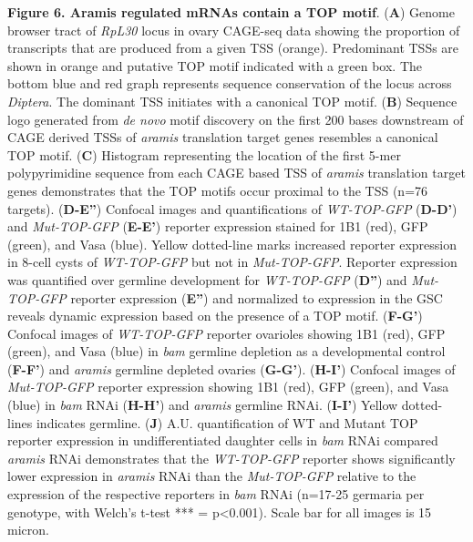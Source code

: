 \documentclass[12pt,twoside]{reedthesis}
\begin{document}
\textbf{Figure 6. Aramis regulated mRNAs contain a TOP motif}. (\textbf{A}) Genome
browser tract of \emph{RpL30} locus in ovary CAGE-seq data showing the
proportion of transcripts that are produced from a given TSS (orange).
Predominant TSSs are shown in orange and putative TOP motif indicated
with a green box. The bottom blue and red graph represents sequence
conservation of the locus across \emph{Diptera}. The dominant TSS initiates
with a canonical TOP motif. (\textbf{B}) Sequence logo generated from \emph{de
novo} motif discovery on the first 200 bases downstream of CAGE derived
TSSs of \emph{aramis} translation target genes resembles a canonical TOP
motif. (\textbf{C}) Histogram representing the location of the first 5-mer
polypyrimidine sequence from each CAGE based TSS of \emph{aramis} translation
target genes demonstrates that the TOP motifs occur proximal to the TSS
(n=76 targets). (\textbf{D-E''}) Confocal images and quantifications of
\emph{WT-TOP-GFP} (\textbf{D-D'}) and \emph{Mut-TOP-GFP} (\textbf{E-E'}) reporter expression
stained for 1B1 (red), GFP (green), and Vasa (blue). Yellow dotted-line
marks increased reporter expression in 8-cell cysts of \emph{WT-TOP-GFP} but
not in \emph{Mut-TOP-GFP}. Reporter expression was quantified over germline
development for \emph{WT-TOP-GFP} (\textbf{D''}) and \emph{Mut-TOP-GFP} reporter
expression (\textbf{E''}) and normalized to expression in the GSC reveals
dynamic expression based on the presence of a TOP motif. (\textbf{F-G'})
Confocal images of \emph{WT-TOP-GFP} reporter ovarioles showing 1B1 (red),
GFP (green), and Vasa (blue) in \emph{bam} germline depletion as a
developmental control (\textbf{F-F'}) and \emph{aramis} germline depleted ovaries
(\textbf{G-G'}). (\textbf{H-I'}) Confocal images of \emph{Mut-TOP-GFP} reporter
expression showing 1B1 (red), GFP (green), and Vasa (blue) in \emph{bam} RNAi
(\textbf{H-H'}) and \emph{aramis} germline RNAi. (\textbf{I-I'}) Yellow dotted-lines
indicates germline. (\textbf{J}) A.U. quantification of WT and Mutant TOP
reporter expression in undifferentiated daughter cells in \emph{bam} RNAi
compared \emph{aramis} RNAi demonstrates that the \emph{WT-TOP-GFP} reporter shows
significantly lower expression in \emph{aramis} RNAi than the \emph{Mut-TOP-GFP}
relative to the expression of the respective reporters in \emph{bam} RNAi
(n=17-25 germaria per genotype, with Welch's t-test *** = p\textless0.001).
Scale bar for all images is 15 micron.
\end{document}
